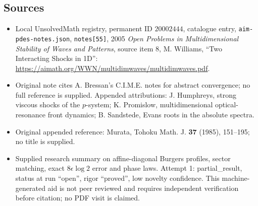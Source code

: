 \documentclass[11pt]{article}
\begin{document}
\subsection{Sources}
\begin{itemize}
\item Local UnsolvedMath registry, permanent ID \(20002444\), catalogue entry, \texttt{aim-pdes-notes.json}, \texttt{notes[55]}, 2005 \emph{Open Problems in Multidimensional Stability of Waves and Patterns}, source item 8, M. Williams, ``Two Interacting Shocks in 1D'': \url{https://aimath.org/WWN/multidimwaves/multidimwaves.pdf}.
\item Original note cites A. Bressan's C.I.M.E. notes for abstract convergence; no full reference is supplied. Appended attributions: J. Humphreys, strong viscous shocks of the \(p\)-system; K. Promislow, multidimensional optical-resonance front dynamics; B. Sandstede, Evans roots in the absolute spectra.
\item Original appended reference: Murata, Tohoku Math. J. \textbf{37} (1985), 151--195; no title is supplied.
\item Supplied research summary on affine-diagonal Burgers profiles, sector matching, exact \(8\epsilon\log2\) error and phase laws. Attempt 1: partial\_result, status at run ``open'', rigor ``proved'', low novelty confidence. This machine-generated aid is not peer reviewed and requires independent verification before citation; no PDF visit is claimed.
\end{itemize}
\end{document}
